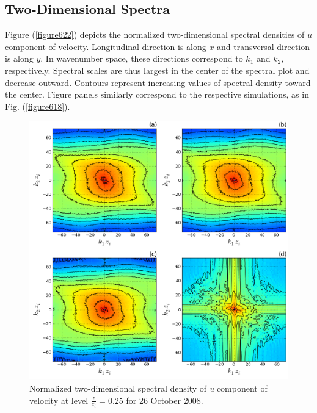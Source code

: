 \subsection{Two-Dimensional Spectra}
\label{spectra2d-634}

Figure (\autoref{figure622}) depicts the normalized two-dimensional spectral densities of $u$ component of velocity. Longitudinal direction is along $x$ and transversal direction is along $y$. In wavenumber space, these directions correspond to $k_1$ and $k_2$, respectively. Spectral scales are thus largest in the center of the spectral plot and decrease outward. Contours represent increasing values of spectral density toward the center. Figure panels similarly correspond to the respective simulations, as in Fig. (\autoref{figure618}).


\begin{figure}[H]
\begin{center}
\includegraphics[width=\textwidth]{figures/chapter6/spectra2D_u_20081026}
\end{center}
\caption{Normalized two-dimensional spectral density of \textit{u} component of velocity at level $\frac{z}{z_i}=0.25$ for 26 October 2008.}
\label{figure622}
\end{figure}


